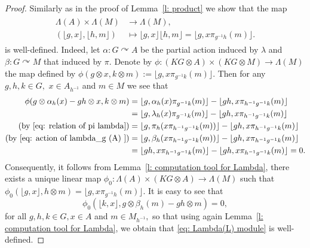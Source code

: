 \documentclass[11pt]{amsart}
\numberwithin{equation}{section}
\theoremstyle{definition}
\theoremstyle{remark}
\begin{document}
\begin{proof} Similarly as in the proof of  Lemma~\ref{l: product} we show that the map
    \begin{align} \label{eq: Lambda(L) module}
        \begin{split}
            \Lambda(A) \times \Lambda(M) &\to \Lambda(M), \\
            (\lfloor g, x \rfloor, \lfloor h, m \rfloor) &\mapsto \lfloor g, x \rfloor \lfloor h, m \rfloor = \lfloor g, x \pi_{g^{-1}h}(m) \rfloor.
        \end{split}
    \end{align}
    is well-defined. Indeed, let $\alpha: G \curvearrowright A $  be the partial action induced by $\lambda $ and 
    $\beta: G \curvearrowright M $ that induced by $\pi .$ Denote by  \( \phi: (KG \otimes A)  \times (KG \otimes M) \to \Lambda(M) \) the map defined   by \( \phi(g \otimes x, k \otimes m) := \lfloor g, x \pi_{g^{-1}k}(m) \rfloor \). Then for any  $g,h, k \in G,$
    \( x \in A_{h^{-1}} \) and $m \in M$ we see that
    \begin{align*}
        \phi( g \otimes \alpha_{h}(x) - gh \otimes x, k \otimes m)
        &= \lfloor g,\alpha_h(x)\pi_{g^{-1}k}(m)\rfloor-\lfloor gh,x\pi_{h^{-1}g^{-1}k}(m)\rfloor \\ 
        &= \lfloor g,\lambda_h(x)\pi_{g^{-1}k}(m)\rfloor-\lfloor gh,x\pi_{h^{-1}g^{-1}k}(m)\rfloor \\
        (\text{by }\eqref{eq: relation of pi lambda})&= \lfloor g,\pi_h(x\pi_{h^{-1}g^{-1}k}(m))\rfloor-\lfloor gh,x\pi_{h^{-1}g^{-1}k}(m)\rfloor \\
        (\text{by }\eqref{eq: action of lambda_g (A) })&= \lfloor g,\beta_h(x\pi_{h^{-1}g^{-1}k}(m))\rfloor-\lfloor gh,x\pi_{h^{-1}g^{-1}k}(m)\rfloor \\
        &=\lfloor gh,x\pi_{h^{-1}g^{-1}k}(m)\rfloor-\lfloor gh,x\pi_{h^{-1}g^{-1}k}(m)\rfloor=0.
    \end{align*}
    Consequently, it follows  from Lemma~\ref{l: computation tool for Lambda}, there exists a unique linear map \( \phi_0 : \Lambda(A) \times  (KG \otimes A) \to \Lambda(
    M) \) such that  \(\phi_0( \lfloor g, x \rfloor , h \otimes m ) = \lfloor g, x \pi_{g^{-1}h}(m) \rfloor \). It is easy to see that 
    $$\phi_0(\lfloor k, x \rfloor, g \otimes \beta_{h}(m) - gh \otimes m) = 0,$$ for all $g,h,k\in G, x \in A$ and $m\in M_{h^{-1}},$ so that 
    using again Lemma~\ref{l: computation tool for Lambda},  we obtain that \eqref{eq: Lambda(L) module} is  well-defined.



\end{proof}
\end{document}
